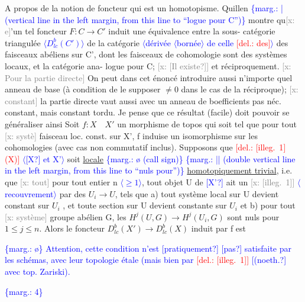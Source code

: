 \documentclass[11pt]{article}
\newcommand{\scanpage}[1]{\par\bigskip\noindent{\small\sffamily[scan #1]}\par}
\newcommand{\mspage}[1]{{\small\sffamily[p.\,#1]}}
\newcommand{\hand}[1]{\textcolor{blue}{#1}}
\newcommand{\inserted}[2][]{\textcolor{blue}{$\langle$#2$\rangle$}}
\newcommand{\margin}[1]{\textcolor{blue}{\{\textsf{marg.:} #1\}}}
\newcommand{\deleted}[1]{\textcolor{red}{[\textsf{del.:} #1]}}
\newcommand{\xout}[1]{\textcolor{gray}{[\textsf{x:} #1]}}
\newcommand{\uline}[1]{\underline{#1}}
\newcommand{\unsure}[1]{[#1?]}
\newcommand{\illegible}[1]{[\textsf{illeg.\ #1}]}
\begin{document}
A propos de la notion de foncteur qui est un homotopisme. Quillen
\margin{| (vertical line in the left margin, from this line to ``logue pour C'')} montre qu\xout{e}'un tel foncteur $F\colon C \to C'$ induit une équivalence entre la sous-
catégorie triangulée \inserted{$D^b_{lc}(C')$} de la catégorie \inserted{dérivée \inserted{bornée} de celle \deleted{des}} des faisceaux abéliens sur C', dont
les faisceaux de cohomologie sont des systèmes locaux, et la catégorie ana-
logue pour C; \xout{\unsure{Il existe}} et réciproquement. \xout{Pour la partie directe} On peut
dans cet énoncé introduire aussi n'importe quel anneau de base (à condition
de le supposer $\neq 0$ dans le cas de la réciproque); \xout{constant} la partie directe
vaut aussi avec un anneau de boefficients pas néc. constant, mais constant
tordu. Je pense que ce résultat (facile) doit pouvoir se généraliser ainsi
Soit $f\colon X \quad X'$ un morphisme de topos qui soit tel que pour tout \xout{systè}
faisceau loc. const. sur X', f induise un isomorphisme sur les cohomologies
(avec cas non commutatif inclus). Supposons que \deleted{\illegible{1} (X)} \inserted{\unsure{X} et X'} soit \uline{locale}
\margin{\o{} (call sign)} \margin{|| (double vertical line in the left margin, from this line to ``nuls pour'')} \uline{homotopiquement trivial}, i.e. que \xout{tout} pour tout entier n \inserted{$\geq 1$}, tout objet U de
\hand{\unsure{X'}} ait un \xout{\illegible{1}} \inserted[typed]{recouvrement} par des $U_i \to U$, tels que a) tout système local sur U
devient constant sur $U_i$ , et toute section sur U devient constante sur $U_i$
et b) pour tout \xout{système} groupe abélien G, les $H^j(U,G) \longrightarrow H^j(U_i,G)$ sont
nuls pour $1 \leq j \leq n$. Alors le foncteur $D^b_{lc}(X') \longrightarrow D^b_{lc}(X)$ induit par f est

\margin{\o{}} \hand{Attention, cette condition n'est \unsure{pratiquement} \unsure{pas} satisfaite par les schémas, avec leur topologie étale (mais bien par \deleted{\illegible{1}} \unsure{(noeth.} avec top. Zariski).}

\margin{4}

\clearpage
\scanpage{162-5/5}
\mspage{\hand{4}}
\end{document}
